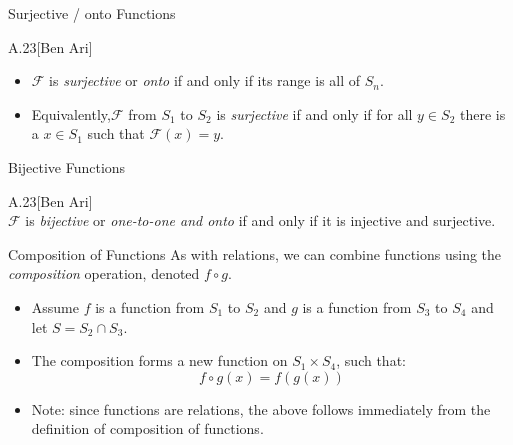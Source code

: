 \documentclass[style=sailor,size=12pt]{powerdot}
\begin{document}
\begin{slide}[bm=,toc=]{Surjective / onto Functions}
\begin{defn}{A.23}[Ben Ari]~\\
\begin{itemize}
\item  $\mathcal{F}$ is \emph{surjective} or \emph{onto} if and only if
its range is all of $S_n$.
\item Equivalently,$\mathcal{F}$ from $S_1$ to $S_2$ is \emph{surjective} if 
and only if for all $y \in S_2$ there is a $x \in S_1$ such that
$\mathcal{F}(x) = y$. 
\end{itemize}
\end{defn}
\end{slide}

\begin{slide}[bm=,toc=]{Bijective Functions}
\begin{defn}{A.23}[Ben Ari]~\\
$\mathcal{F}$ is \emph{bijective} or \emph{one-to-one and onto} if and only if
it is injective and surjective.
\end{defn}
\end{slide}

\begin{slide}[bm=,toc=]{Composition of Functions}
As with relations, we can combine functions using the \emph{composition} operation, 
denoted $f \circ g$.
\begin{itemize}
\item Assume $f$ is a function from $S_1$ to $S_2$ and $g$ is a function from 
$S_3$ to $S_4$ and let $S = S_2 \cap S_3$.
\item The composition forms a new function on $S_1 \times S_4$, such that:
\[
  f \circ g(x) = f(g(x))
\]
\vspace{-5mm}
\item Note: since functions are relations, the above follows immediately from
the definition of composition of functions.
\end{itemize}

\end{slide}
\end{document}
